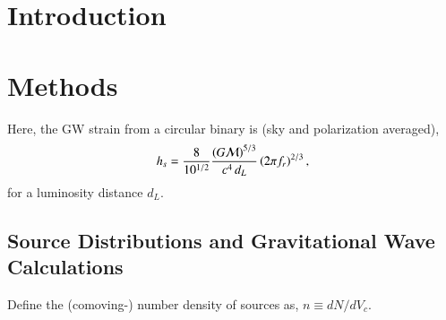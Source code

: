 \section{Introduction}
    \label{sec:intro}




\section{Methods}
    \label{sec:meth}

    Here, the GW strain from a circular binary is \citep[][Eq.~7]{Sesana+2008} (sky and polarization averaged),
        \begin{equation}
        \label{eq:source_strain}
        h_s = \frac{8}{10^{1/2}} \frac{\left(G\mathcal{M}\right)^{5/3}}{c^4 \, d_L}
            \left(2 \pi f_r \right)^{2/3},
        \end{equation}
    for a luminosity distance $d_L$.

    \subsection{Source Distributions and Gravitational Wave Calculations}

        Define the (comoving-) number density of sources as, $n \equiv dN / dV_c$.

